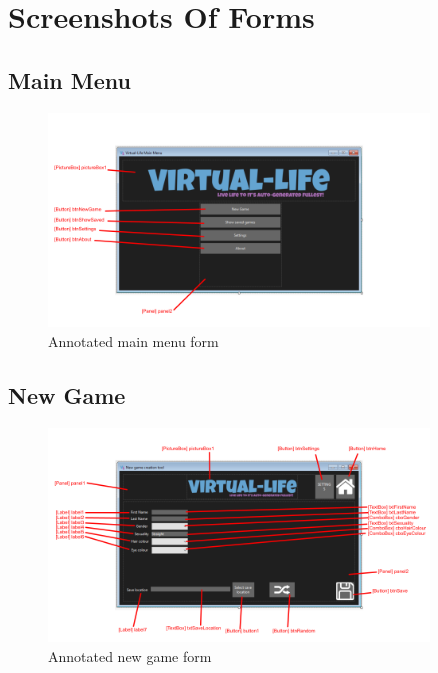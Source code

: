 \chapter{Screenshots Of Forms}
\label{app:ScreenshotsOfForms}

\section{Main Menu}
\begin{figure}[H]
    \centering
    \includegraphics[width=0.9\textwidth]{images/forms/menu.png}
    \caption{Annotated main menu form}
    \label{fig:forms-menu}
\end{figure}

\section{New Game}
\begin{figure}[H]
    \centering
    \includegraphics[width=0.9\textwidth]{images/forms/newGame.png}
    \caption{Annotated new game form}
    \label{fig:forms-newGame}
\end{figure}

